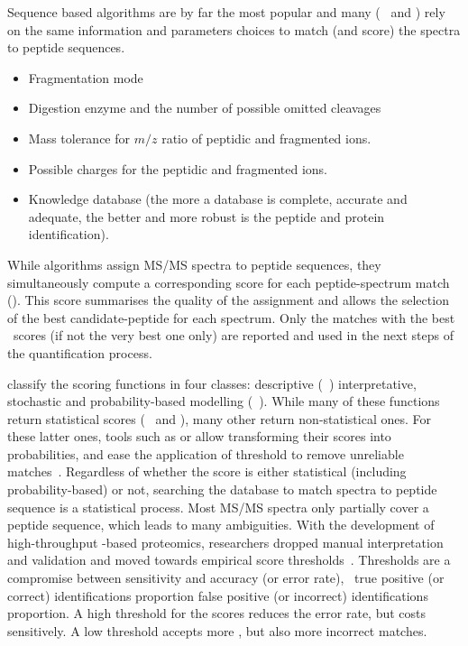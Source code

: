 Sequence based algorithms are by far the most popular
and many (\eg\  and ) rely on
the same information and parameters choices to match
(and score) the spectra to peptide sequences.\mybr\
\begin{itemize}[topsep=0pt,nosep]
    \item Fragmentation mode
    \item Digestion enzyme and the number of possible omitted cleavages
    \item Mass tolerance for $m/z$ ratio of peptidic and fragmented ions.
    \item Possible charges for the peptidic and fragmented ions.
    \item Knowledge database (the more a database is complete, accurate and adequate,
       the better and more robust is the peptide and protein identification).
\end{itemize}


While algorithms assign \gls{MS/MS} spectra to peptide sequences,
they simultaneously compute a corresponding score
for each peptide-spectrum match (\psm).
This score summarises the quality of the assignment
and allows the selection of the best candidate-peptide for each spectrum.
Only the matches with the best \psm\ scores (if not the very best one only)
are reported and used in the next steps of the quantification process.\mybr\

\citet{Sadygov2004-nl} classify the scoring functions in four classes:
descriptive (\eg\ )
interpretative, stochastic and probability-based modelling (\eg\ ).
While many of these functions return statistical scores
(\eg\ \soft{Mascot} and ),
many other return non-statistical ones.
For these latter ones,
tools such as 
or 
allow transforming their scores into probabilities,
and ease the application of threshold to remove unreliable matches~.
Regardless of whether the score is either statistical (including probability-based) or not,
searching the database to match spectra to peptide sequence is a statistical process.
Most \gls{MS/MS} spectra only partially cover a peptide sequence,
which leads to many ambiguities.
With the development of high-throughput \ms-based proteomics,
researchers dropped manual interpretation and validation
and moved towards empirical score thresholds~.
Thresholds are a compromise between sensitivity and accuracy (or error rate),
\ie\ true positive (or correct) identifications proportion
 false positive (or incorrect) identifications proportion.
A high threshold for the scores reduces the error rate, but costs sensitively.
A low threshold accepts more \psms, but also more incorrect matches.\mybr\

